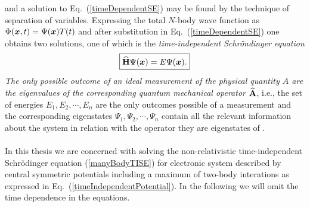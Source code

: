 and a solution to  Eq.~(\ref{timeDependentSE}) may be found by the technique of separation of variables. Expressing the total $N$-body wave function as $\Phi(\boldsymbol{x}, t) = \Psi(\boldsymbol{x}) T(t)$ and after substitution in  Eq.~(\ref{timeDependentSE}) one obtains two solutions, one of which is the \emph{time-independent Schr\"ondinger equation}
\begin{equation}\label{manyBodyTISE}
\boxed{{\bf\widehat{H}} \Psi(\boldsymbol{x}) = E \Psi(\boldsymbol{x}).}
\end{equation}
\emph{The only possible outcome of  an ideal measurement of the physical quantity $A$ are the ei\-gen\-va\-lues of the corresponding quantum mechanical operator ${\bf\widehat{A}}$}, i.e., the set of energies $E_1, E_2, \cdots, E_n$ are the only outcomes possible of a measurement and the corresponding eigenstates $\Psi_1, \Psi_2, \cdots, \Psi_n$ contain all the relevant information about the system in relation with the operator they are eigenstates of \cite{Bowman}.\\
\\
In this thesis we are concerned with solving the non-relativistic time-independent Schr\"odinger equation  (\ref{manyBodyTISE}) for electronic system described by central symmetric potentials including a ma\-xi\-mum of two-body interations as expressed in  Eq.~(\ref{timeIndependentPotential}). In the following we will omit the time dependence in the equations.


